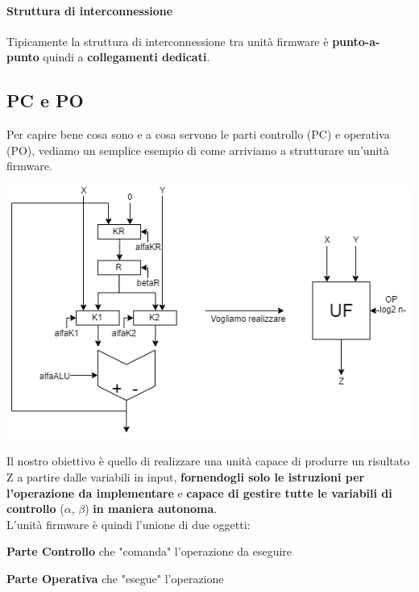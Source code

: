 \documentclass[10pt]{report}
\begin{document}
\paragraph{Struttura di interconnessione} Tipicamente la struttura di interconnessione tra unità firmware è \textbf{punto-a-punto} quindi a \textbf{collegamenti dedicati}.
\subsection{PC e PO}
Per capire bene cosa sono e a cosa servono le parti controllo (PC) e operativa (PO), vediamo un semplice esempio di come arriviamo a strutturare un'unità firmware.
\begin{center}
\includegraphics[scale=0.6]{ufesempio.png}
\end{center}
Il nostro obiettivo è quello di realizzare una unità capace di produrre un risultato Z a partire dalle variabili in input, \textbf{fornendogli solo le istruzioni per l'operazione da implementare} e \textbf{capace di gestire tutte le variabili di controllo} ($\alpha$, $\beta$) \textbf{in maniera autonoma}.\\
L'unità firmware è quindi l'unione di due oggetti:
\begin{list}{}{}
\item \textbf{Parte Controllo} che "comanda" l'operazione da eseguire
\item \textbf{Parte Operativa} che "esegue" l'operazione
\end{list}
\pagebreak
\end{document}
